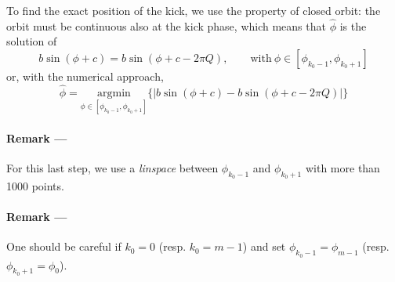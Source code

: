 \documentclass[12pt,a4paper]{article}
\begin{document}
	To find the exact position of the kick, we use the property of closed orbit: the orbit must be continuous also at the kick phase, which means that $\hat{\phi}$ is the solution of
	\begin{equation}
		 b \sin(\phi + c) = b\sin(\phi+c-2 \pi Q), \qquad \mathrm{with}~ \phi \in [\phi_{k_0-1}, \phi_{k_0+1}]
	\end{equation}
	or, with the numerical approach, 
	\begin{equation}
		\hat{\phi} =  \underset{\phi \in [\phi_{k_0-1}, \phi_{k_0+1}]}{\textrm{argmin}}\{|b \sin(\phi + c) - b\sin(\phi+c-2 \pi Q)|\}
	\end{equation}
	
	\paragraph{Remark ---} For this last step, we use a \textit{linspace} between $\phi_{k_0-1}$ and $\phi_{k_0+1}$ with more than 1000 points.
	
	\paragraph{Remark ---} One should be careful if $k_0 = 0$ (resp. $k_0 = m-1$) and set $\phi_{k_0-1} =\phi_{m-1}$ (resp. $\phi_{k_0+1} = \phi_{0}$). 
	
\end{document}
